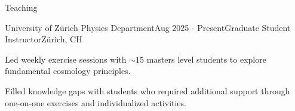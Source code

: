 \documentclass{resume} %
\begin{document}
\begin{rSection}{Teaching}

\begin{rSubsection}{University of Zürich Physics Department}{Aug 2025 - Present}{Graduate Student Instructor}{Zürich, CH}
    \item Led weekly exercise sessions with $\sim15$ masters level students to explore fundamental cosmology principles. 
    \item Filled knowledge gaps with students who required additional support through one-on-one exercises and individualized activities.
\end{rSubsection}




\end{rSection}
\end{document}
